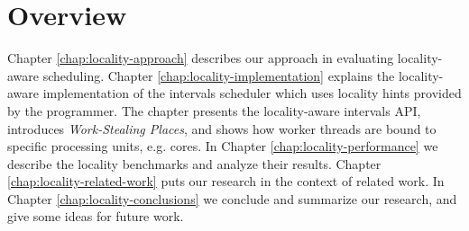 





\section{Overview}
\label{sec:locality-intro-overview}

Chapter \ref{chap:locality-approach} describes our approach in
evaluating locality-aware scheduling. Chapter
\ref{chap:locality-implementation} explains the locality-aware
implementation of the intervals scheduler which uses locality hints
provided by the programmer. The chapter presents the locality-aware
intervals API, introduces \emph{Work-Stealing Places}, and shows how
worker threads are bound to specific processing units, e.g. cores.  In
Chapter \ref{chap:locality-performance} we describe the locality
benchmarks and analyze their results. Chapter
\ref{chap:locality-related-work} puts our research in the context of
related work. In Chapter \ref{chap:locality-conclusions} we conclude
and summarize our research, and give some ideas for future work.


